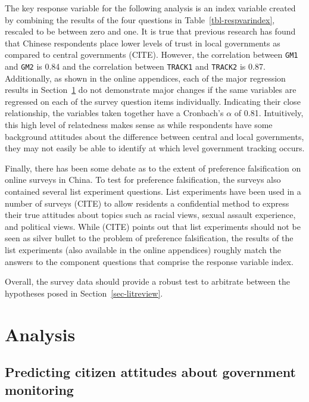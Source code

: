 \documentclass[
  letterpaper,
  DIV=11,
  numbers=noendperiod]{scrartcl}
\begin{document}
The key response variable for the following analysis is an index
variable created by combining the results of the four questions in
Table~\ref{tbl-respvarindex}, rescaled to be between zero and one. It is
true that previous research has found that Chinese respondents place
lower levels of trust in local governments as compared to central
governments (CITE). However, the correlation between \texttt{GM1} and
\texttt{GM2} is 0.84 and the correlation between \texttt{TRACK1} and
\texttt{TRACK2} is 0.87. Additionally, as shown in the online
appendices, each of the major regression results in
Section~\ref{sec-analysis} do not demonstrate major changes if the same
variables are regressed on each of the survey question items
individually. Indicating their close relationship, the variables taken
together have a Cronbach's \(\alpha\) of 0.81. Intuitively, this high
level of relatedness makes sense as while respondents have some
background attitudes about the difference between central and local
governments, they may not easily be able to identify at which level
government tracking occurs.

Finally, there has been some debate as to the extent of preference
falsification on online surveys in China. To test for preference
falsification, the surveys also contained several list experiment
questions. List experiments have been used in a number of surveys (CITE)
to allow residents a confidential method to express their true attitudes
about topics such as racial views, sexual assault experience, and
political views. While (CITE) points out that list experiments should
not be seen as silver bullet to the problem of preference falsification,
the results of the list experiments (also available in the online
appendices) roughly match the answers to the component questions that
comprise the response variable index.

Overall, the survey data should provide a robust test to arbitrate
between the hypotheses posed in Section~\ref{sec-litreview}.

\section{Analysis}\label{sec-analysis}

\subsection{Predicting citizen attitudes about government
monitoring}\label{predicting-citizen-attitudes-about-government-monitoring}
\end{document}
